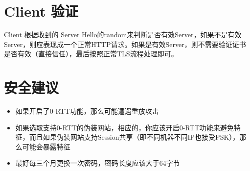 \section{Client 验证}
Client 根据收到的 Server Hello的random来判断是否有效Server，如果不是有效Server，则应表现成一个正常HTTP请求。如果是有效Server，则不需要验证证书是否有效（直接信任），最后按照正常TLS流程处理即可。

\section{安全建议}
\begin{itemize}
	\item 如果开启了0-RTT功能，那么可能遭遇重放攻击
	\item 如果选取支持0-RTT的伪装网站，相应的，你应该开启0-RTT功能来避免特征，而且如果伪装网站支持Session共享（即不同机器不同IP也接受PSK），那么可能会暴露特征
	\item 最好每三个月更换一次密码，密码长度应该大于64字节
\end{itemize}
